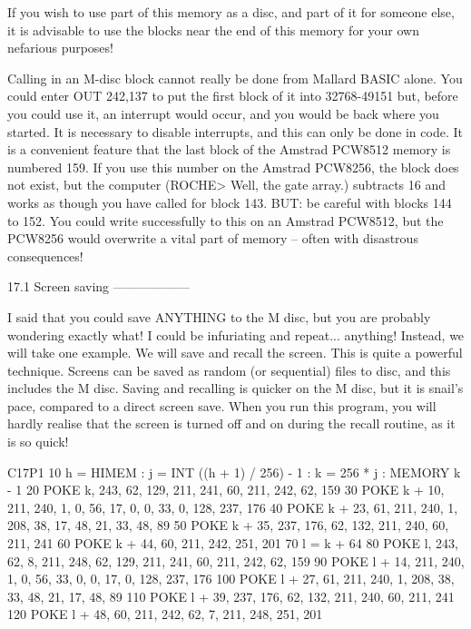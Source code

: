 If  you wish to use part of this memory as a disc, and part of it for  someone 
else,  it is advisable to use the blocks near the end of this memory for  your 
own nefarious purposes!

Calling in an M-disc block cannot really be done from Mallard BASIC alone. You 
could  enter  OUT 242,137 to put the first block of it into  32768-49151  but, 
before you could use it, an interrupt would occur, and you would be back where 
you started. It is necessary to disable interrupts, and this can only be  done 
in code. It is a convenient feature that the last block of the Amstrad PCW8512 
memory  is  numbered 159. If you use this number on the Amstrad  PCW8256,  the 
block  does  not  exist,  but the computer  (ROCHE>  Well,  the  gate  array.) 
subtracts  16  and  works as though you have called for  block  143.  BUT:  be 
careful  with  blocks 144 to 152. You could write successfully to this  on  an 
Amstrad  PCW8512,  but the PCW8256 would overwrite a vital part of  memory  -- 
often with disastrous consequences!


17.1 Screen saving
------------------

I  said  that  you could save ANYTHING to the M disc,  but  you  are  probably 
wondering  exactly  what!  I  could be  infuriating  and  repeat...  anything! 
Instead, we will take one example. We will save and recall the screen. This is 
quite  a  powerful technique. Screens can be saved as random  (or  sequential) 
files  to disc, and this includes the M disc. Saving and recalling is  quicker 
on the M disc, but it is snail's pace, compared to a direct screen save.  When 
you  run this program, you will hardly realise that the screen is  turned  off 
and on during the recall routine, as it is so quick!

        C17P1
        10 h = HIMEM : j = INT ((h + 1) / 256) - 1 : k = 256 * j : MEMORY k  - 
1
        20 POKE k, 243, 62, 129, 211, 241, 60, 211, 242, 62, 159
        30 POKE k + 10, 211, 240, 1, 0, 56, 17, 0, 0, 33, 0, 128, 237, 176
        40 POKE k + 23, 61, 211, 240, 1, 208, 38, 17, 48, 21, 33, 48, 89
        50 POKE k + 35, 237, 176, 62, 132, 211, 240, 60, 211, 241
        60 POKE k + 44, 60, 211, 242, 251, 201
        70 l = k + 64
        80 POKE l, 243, 62, 8, 211, 248, 62, 129, 211, 241, 60, 211, 242,  62, 
159
        90 POKE l + 14, 211, 240, 1, 0, 56, 33, 0, 0, 17, 0, 128, 237, 176
        100 POKE l + 27, 61, 211, 240, 1, 208, 38, 33, 48, 21, 17, 48, 89
        110 POKE l + 39, 237, 176, 62, 132, 211, 240, 60, 211, 241
        120 POKE l + 48, 60, 211, 242, 62, 7, 211, 248, 251, 201

